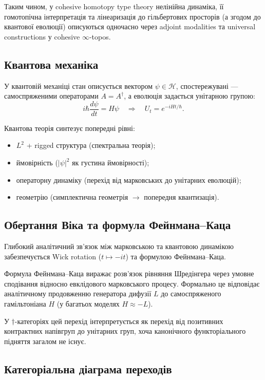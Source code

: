 \documentclass[a4paper,12pt]{article}
\begin{document}
Таким чином, у cohesive homotopy type theory нелінійна динаміка, її гомотопічна інтерпретація та лінеаризація до гільбертових просторів (а згодом до квантової еволюції) описуються одночасно через adjoint modalities та universal constructions у cohesive \(\infty\)-topos.

\subsection{Квантова механіка}

У квантовій механіці стан описується вектором $\psi \in \mathcal{H}$, спостережувані — самоспряженими операторами $A = A^\dagger$, а еволюція задається унітарною групою:
\[
i\hbar \frac{d\psi}{dt} = H\psi \quad \Longrightarrow \quad U_t = e^{-iHt/\hbar}.
\]

Квантова теорія синтезує попередні рівні:
\begin{itemize}
    \item $L^2$ + rigged структура (спектральна теорія);
    \item ймовірність ($|\psi|^2$ як густина ймовірності);
    \item операторну динаміку (перехід від марковських до унітарних еволюцій);
    \item геометрію (симплектична геометрія $\to$ попередня квантизація).
\end{itemize}

\subsection{Обертання Віка та формула Фейнмана–Каца}

Глибокий аналітичний зв’язок між марковською та квантовою динамікою забезпечується Wick rotation ($t \mapsto -it$) та формулою Фейнмана–Каца. 

Формула Фейнмана–Каца виражає розв’язок рівняння Шредінгера через умовне сподівання відносно евклідового марковського процесу. Формально це відповідає аналітичному продовженню генератора дифузії $L$ до самоспряженого гамільтоніана $H$ (у багатьох моделях $H \approx -L$).

У $\dagger$-категоріях цей перехід інтерпретується як перехід від позитивних контрактних напівгруп до унітарних груп, хоча канонічного функторіального підняття загалом не існує.

\newpage
\subsection{Категоріальна діаграма переходів}
\end{document}
